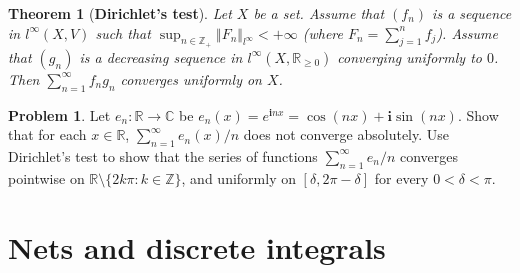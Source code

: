 \documentclass[12pt,b5paper,notitlepage]{article}
\theoremstyle{definition}
\newtheorem{prob}{\color{red}Problem}[section]
\newtheorem{sprob}[prob]{\color{red}$\star$ Problem}
\theoremstyle{plain}
\newtheorem{thm}[df]{Theorem}
\newcommand{\ovl}{\overline}
\newcommand{\im}{\mathbf{i}}
\newcommand{\Cbb}{\mathbb C}
\newcommand{\Zbb}{\mathbb Z}
\newcommand{\Rbb}{\mathbb R}
\numberwithin{equation}{section}
\begin{document}
\begin{thm}[\textbf{Dirichlet's test}]
Let $X$ be a set. Assume that $(f_n)$ is a sequence in $l^\infty(X,V)$ such that $\sup_{n\in\Zbb_+}\Vert F_n\Vert_{l^\infty}<+\infty$ (where $F_n=\sum_{j=1}^n f_j$). Assume that $(g_n)$ is a decreasing sequence in $l^\infty(X,\Rbb_{\geq0})$ converging uniformly to $0$. Then $\sum_{n=1}^\infty f_ng_n$ converges uniformly on $X$.
\end{thm}


\begin{prob}\label{lb394}
Let $e_n:\Rbb\rightarrow\Cbb$ be $e_n(x)=e^{\im nx}=\cos(nx)+\im\sin(nx)$. Show that for each $x\in\Rbb$, $\sum_{n=1}^\infty e_n(x)/n$ does not converge absolutely. Use Dirichlet's test to show that the series of functions $\sum_{n=1}^\infty e_n/n$ converges pointwise on $\Rbb\setminus\{2k\pi:k\in\Zbb\}$, and uniformly on $[\delta,2\pi-\delta]$ for every $0<\delta<\pi$.
\end{prob}











\begin{comment}

\subsection{Problems and supplementary material}

\begin{sprob}
Consider a power series $\sum a_nz^n$ where $a_n\in\Rbb_{\geq 0}$ for each $n$. Let $R$ be its radius of convergence. Prove that the following are equivalent.
\begin{enumerate}[label=(\arabic*)]
\item $\sum a_n<+\infty$.
\item $\sum a_nz^n$ converges uniformly on $\ovl B_\Cbb(0,R)$ to a continuous function.
\item $\sum a_nz^n$ converges uniformly on $B_\Cbb(0,R)$.
\end{enumerate}
\end{sprob}
\end{comment}


\newpage


\section{Nets and discrete integrals}
\end{document}

